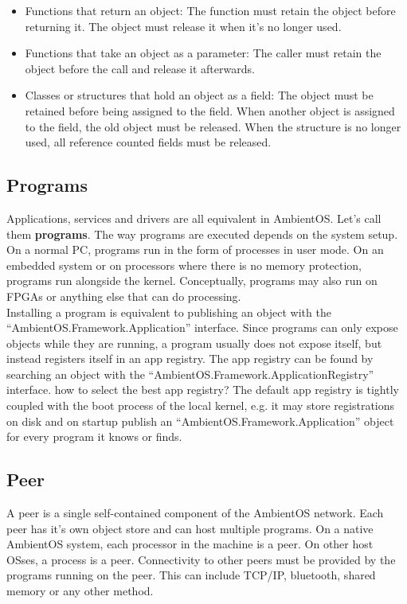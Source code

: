 \documentclass[a4paper]{article}
\begin{document}
\begin{itemize}
  \item Functions that return an object: The function must retain the object before returning it. The object must release it when it's no longer used.
  \item Functions that take an object as a parameter: The caller must retain the object before the call and release it afterwards.
  \item Classes or structures that hold an object as a field: The object must be retained before being assigned to the field. When another object is assigned to the field, the old object must be released. When the structure is no longer used, all reference counted fields must be released.
\end{itemize}

\subsection{Programs}
Applications, services and drivers are all equivalent in AmbientOS. Let's call them {\bf programs}. The way programs are executed depends on the system setup. On a normal PC, programs run in the form of processes in user mode. On an embedded system or on processors where there is no memory protection, programs run alongside the kernel. Conceptually, programs may also run on FPGAs or anything else that can do processing. \\
Installing a program is equivalent to publishing an object with the ``AmbientOS.Framework.Application'' interface. Since programs can only expose objects while they are running, a program usually does not expose itself, but instead registers itself in an app registry. The app registry can be found by searching an object with the ``AmbientOS.Framework.ApplicationRegistry'' interface. {\q how to select the best app registry?} The default app registry is tightly coupled with the boot process of the local kernel, e.g. it may store registrations on disk and on startup publish an ``AmbientOS.Framework.Application'' object for every program it knows or finds.

\subsection{Peer}
A peer is a single self-contained component of the AmbientOS network. Each peer has it's own object store and can host multiple programs. On a native AmbientOS system, each processor in the machine is a peer. On other host OSses, a process is a peer. Connectivity to other peers must be provided by the programs running on the peer. This can include TCP/IP, bluetooth, shared memory or any other method.
\end{document}
